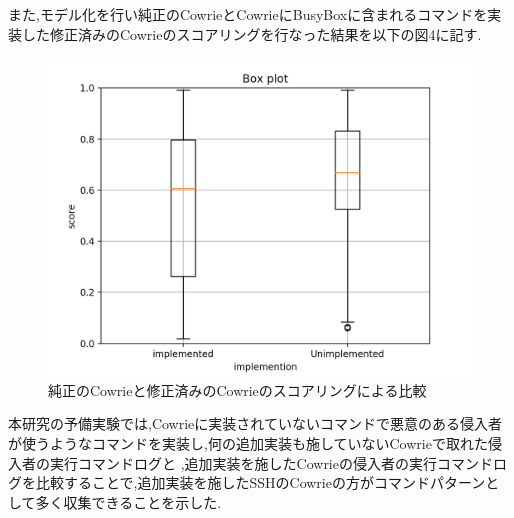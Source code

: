 また,モデル化を行い純正のCowrieとCowrieにBusyBoxに含まれるコマンドを実装した修正済みのCowrieのスコアリングを行なった結果を以下の図4に記す.

\begin{figure}[H]
    \centering
    \includegraphics[width=1.0\textwidth]{figures/Figure_1.png}
    \caption{純正のCowrieと修正済みのCowrieのスコアリングによる比較}
    \label{fig:evo}
\end{figure}

本研究の予備実験では,Cowrieに実装されていないコマンドで悪意のある侵入者が使うようなコマンドを実装し,何の追加実装も施していないCowrieで取れた侵入者の実行コマンドログと ,追加実装を施したCowrieの侵入者の実行コマンドログを比較することで,追加実装を施したSSHのCowrieの方がコマンドパターンとして多く収集できることを示した.


